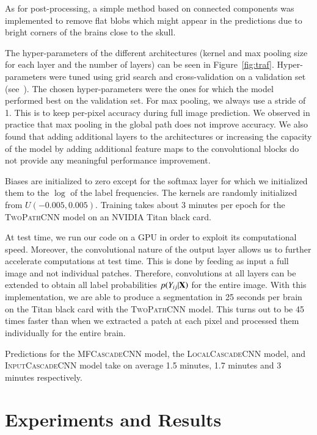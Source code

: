 \documentclass[final,5p,times,twocolumn]{elsarticle}
\newcommand{\PMJ}[1]{\textcolor{green}{\small{}[\textbf{Pierre-Marc:} #1]}}
\begin{document}
As for post-processing, a simple method based on connected components was implemented to remove flat blobs which might appear in the predictions due to bright corners of the brains close to the skull.


The hyper-parameters of the different architectures (kernel and max pooling size for each layer and the number of layers) can be seen in Figure~\ref{fig:traf}. Hyper-parameters were tuned using grid search and cross-validation on a validation set (see~\citet{bengio2012}). The chosen hyper-parameters were the ones for which the model performed best on the validation set. For max pooling, we always use a stride of 1. This is to keep per-pixel accuracy during full image prediction. We observed in practice that max pooling in the global path does not improve accuracy.  We also found that adding additional layers to the architectures or increasing the capacity of the model by adding additional feature maps to the convolutional blocks do not provide any meaningful performance improvement. %

Biases are initialized to zero except for the softmax layer for which we initialized them to the $\log$ of the label frequencies. The kernels are randomly initialized from $U\left(-0.005 , 0.005\right)$.
Training takes about 3 minutes per epoch for the \textsc{TwoPathCNN} model on an NVIDIA Titan black card.

At test time, we run our code on a GPU in order to exploit its computational speed. Moreover, the convolutional nature of the output layer allows us to further accelerate computations at test time. This is done by feeding as input a full image and not individual patches.  Therefore, convolutions at all layers can be extended to obtain all label probabilities $p(Y_{ij}|{\bf X})$ for the entire image.
With this implementation, we are able to produce a segmentation in 25 seconds per brain on the Titan black card with the \textsc{TwoPathCNN} model. This turns out to be 45 times faster than when we extracted a patch at each pixel and processed them individually for the entire brain. 

Predictions for the \textsc{MFCascadeCNN} model, the \textsc{LocalCascadeCNN} model, and  \textsc{InputCascadeCNN} model take on average 1.5 minutes, 1.7 minutes and 3 minutes respectively. 



%

\section{Experiments and Results}
\label{sec:experiments}
%
\end{document}
